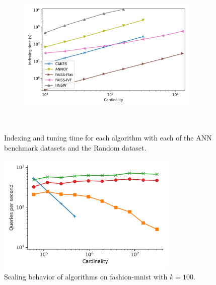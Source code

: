 \documentclass[review,supplement,onefignum,onetabnum]{siamonline220329}
\begin{document}
\begin{figure}
\begin{subfigure}[b]{0.47\textwidth}
        \label{fig:supplement:sift-indexing}
    \end{subfigure}%
    \begin{subfigure}[b]{0.47\textwidth}
        \includegraphics[width=0.95\textwidth]{plots/random-indexing.png}\\
        \label{fig:supplement:random-indexing}
    \end{subfigure}%
    \\
    \vspace{1em}
    \caption{Indexing and tuning time for each algorithm with each of the ANN benchmark datasets and the Random dataset.}
    \label{fig:supplement:indexing}
\end{figure}

\begin{figure}[ht!]
    \centering
    \includegraphics[width=3.4in]{plots/fashion-mnist_PermutedBall_100_throughput.png}
    \caption{
        Scaling behavior of algorithms on fashion-mnist with $k=100$.
    }
    \label{fig:supplement:fashion-mnist-k-100}
\end{figure}
\end{document}
